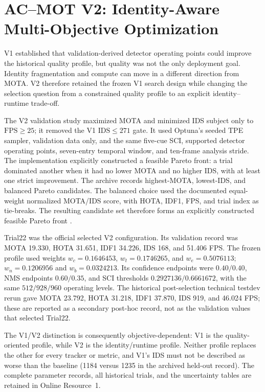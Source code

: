\section{AC--MOT V2: Identity-Aware Multi-Objective Optimization}
V1 established that validation-derived detector operating points could improve
the historical quality profile, but quality was not the only deployment goal.
Identity fragmentation and compute can move in a different direction from
MOTA. V2 therefore retained the frozen V1 search design while changing the
selection question from a constrained quality profile to an explicit
identity--runtime trade-off.

The V2 validation study maximized MOTA and minimized IDS subject only to
$\mathrm{FPS}\geq25$; it removed the V1 $\mathrm{IDS}\leq271$ gate. It used
Optuna's seeded TPE sampler, validation data only, and the same five-cue SCI,
supported detector operating points, seven-entry temporal window, and
ten-frame analysis stride. The implementation explicitly constructed a
feasible Pareto front: a trial dominated another when it had no lower MOTA and
no higher IDS, with at least one strict improvement. The archive records
highest-MOTA, lowest-IDS, and balanced Pareto candidates. The balanced choice
used the documented equal-weight normalized MOTA/IDS score, with HOTA, IDF1,
FPS, and trial index as tie-breaks. The resulting candidate set therefore
forms an explicitly constructed feasible Pareto front \cite{deb2002nsga2}.

Trial22 was the official selected V2 configuration. Its validation record was
MOTA 19.330, HOTA 31.651, IDF1 34.226, IDS 168, and 51.406 FPS. The frozen
profile used weights $w_c=0.1646453$, $w_t=0.1746265$, and $w_e=0.5076113$;
$w_n=0.1206956$ and $w_b=0.0324213$. Its confidence endpoints were
$0.40/0.40$, NMS endpoints $0.60/0.35$, and SCI thresholds
$0.2927136/0.6661672$, with the same $512/928/960$ operating levels. The
historical post-selection technical testdev rerun gave MOTA 23.792, HOTA
31.218, IDF1 37.870, IDS 919, and 46.024 FPS; these are reported as a
secondary post-hoc record, not as the validation values that selected Trial22.

The V1/V2 distinction is consequently objective-dependent: V1 is the
quality-oriented profile, while V2 is the identity/runtime profile. Neither
profile replaces the other for every tracker or metric, and V1's IDS must not
be described as worse than the baseline (1184 versus 1235 in the archived
held-out record). The complete parameter records, all historical trials, and
the uncertainty tables are retained in Online Resource~1.
